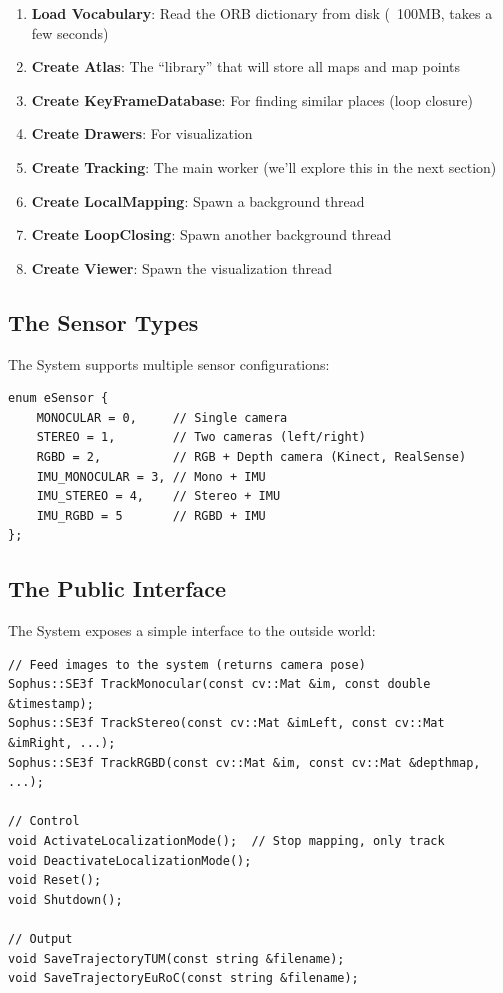 \begin{enumerate}
    \item \textbf{Load Vocabulary}: Read the ORB dictionary from disk (~100MB, takes a few seconds)
    \item \textbf{Create Atlas}: The ``library'' that will store all maps and map points
    \item \textbf{Create KeyFrameDatabase}: For finding similar places (loop closure)
    \item \textbf{Create Drawers}: For visualization
    \item \textbf{Create Tracking}: The main worker (we'll explore this in the next section)
    \item \textbf{Create LocalMapping}: Spawn a background thread
    \item \textbf{Create LoopClosing}: Spawn another background thread
    \item \textbf{Create Viewer}: Spawn the visualization thread
\end{enumerate}

\subsection{The Sensor Types}

The System supports multiple sensor configurations:

\begin{lstlisting}[caption={Sensor types enum}]
enum eSensor {
    MONOCULAR = 0,     // Single camera
    STEREO = 1,        // Two cameras (left/right)
    RGBD = 2,          // RGB + Depth camera (Kinect, RealSense)
    IMU_MONOCULAR = 3, // Mono + IMU
    IMU_STEREO = 4,    // Stereo + IMU
    IMU_RGBD = 5       // RGBD + IMU
};
\end{lstlisting}

\subsection{The Public Interface}

The System exposes a simple interface to the outside world:

\begin{lstlisting}[caption={System's main interface}]
// Feed images to the system (returns camera pose)
Sophus::SE3f TrackMonocular(const cv::Mat &im, const double &timestamp);
Sophus::SE3f TrackStereo(const cv::Mat &imLeft, const cv::Mat &imRight, ...);
Sophus::SE3f TrackRGBD(const cv::Mat &im, const cv::Mat &depthmap, ...);

// Control
void ActivateLocalizationMode();  // Stop mapping, only track
void DeactivateLocalizationMode();
void Reset();
void Shutdown();

// Output
void SaveTrajectoryTUM(const string &filename);
void SaveTrajectoryEuRoC(const string &filename);
\end{lstlisting}

